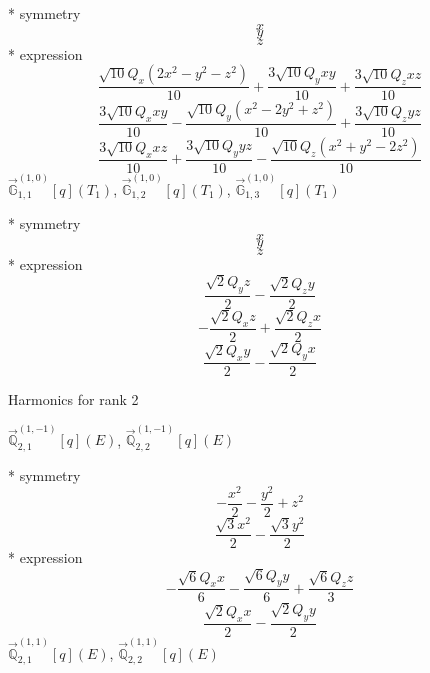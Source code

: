 \documentclass[fleqn,8pt]{jsarticle}
\begin{document}
\noindent\quad ** symmetry
\begin{dmath*}
x
\end{dmath*}
\begin{dmath*}
y
\end{dmath*}
\begin{dmath*}
z
\end{dmath*}
\noindent\quad ** expression
\begin{dmath*}
\frac{\sqrt{10} Q_{x} \left(2 x^{2} - y^{2} - z^{2}\right)}{10} + \frac{3 \sqrt{10} Q_{y} x y}{10} + \frac{3 \sqrt{10} Q_{z} x z}{10}
\end{dmath*}
\begin{dmath*}
\frac{3 \sqrt{10} Q_{x} x y}{10} - \frac{\sqrt{10} Q_{y} \left(x^{2} - 2 y^{2} + z^{2}\right)}{10} + \frac{3 \sqrt{10} Q_{z} y z}{10}
\end{dmath*}
\begin{dmath*}
\frac{3 \sqrt{10} Q_{x} x z}{10} + \frac{3 \sqrt{10} Q_{y} y z}{10} - \frac{\sqrt{10} Q_{z} \left(x^{2} + y^{2} - 2 z^{2}\right)}{10}
\end{dmath*}
\noindent\quad $\vec{\mathbb{G}}_{1,1}^{(1,0)}[q](T_{1})$, $\vec{\mathbb{G}}_{1,2}^{(1,0)}[q](T_{1})$, $\vec{\mathbb{G}}_{1,3}^{(1,0)}[q](T_{1})$

\noindent\quad ** symmetry
\begin{dmath*}
x
\end{dmath*}
\begin{dmath*}
y
\end{dmath*}
\begin{dmath*}
z
\end{dmath*}
\noindent\quad ** expression
\begin{dmath*}
\frac{\sqrt{2} Q_{y} z}{2} - \frac{\sqrt{2} Q_{z} y}{2}
\end{dmath*}
\begin{dmath*}
- \frac{\sqrt{2} Q_{x} z}{2} + \frac{\sqrt{2} Q_{z} x}{2}
\end{dmath*}
\begin{dmath*}
\frac{\sqrt{2} Q_{x} y}{2} - \frac{\sqrt{2} Q_{y} x}{2}
\end{dmath*}

\noindent * Harmonics for rank 2

\noindent\quad $\vec{\mathbb{Q}}_{2,1}^{(1,-1)}[q](E)$, $\vec{\mathbb{Q}}_{2,2}^{(1,-1)}[q](E)$

\noindent\quad ** symmetry
\begin{dmath*}
- \frac{x^{2}}{2} - \frac{y^{2}}{2} + z^{2}
\end{dmath*}
\begin{dmath*}
\frac{\sqrt{3} x^{2}}{2} - \frac{\sqrt{3} y^{2}}{2}
\end{dmath*}
\noindent\quad ** expression
\begin{dmath*}
- \frac{\sqrt{6} Q_{x} x}{6} - \frac{\sqrt{6} Q_{y} y}{6} + \frac{\sqrt{6} Q_{z} z}{3}
\end{dmath*}
\begin{dmath*}
\frac{\sqrt{2} Q_{x} x}{2} - \frac{\sqrt{2} Q_{y} y}{2}
\end{dmath*}
\noindent\quad $\vec{\mathbb{Q}}_{2,1}^{(1,1)}[q](E)$, $\vec{\mathbb{Q}}_{2,2}^{(1,1)}[q](E)$
\end{document}
